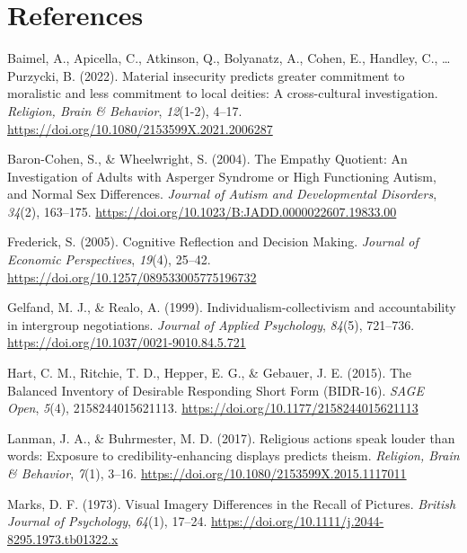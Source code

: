 \documentclass[
  letterpaper,
]{scrbook}
\newlength{\cslhangindent}
\newenvironment{CSLReferences}[2] %
 {\begin{list}{}{%
  \setlength{\itemindent}{0pt}
  \setlength{\leftmargin}{0pt}
  \setlength{\parsep}{0pt}
  \ifodd #1
   \setlength{\leftmargin}{\cslhangindent}
   \setlength{\itemindent}{-1\cslhangindent}
  \fi
  \setlength{\itemsep}{#2\baselineskip}}}
 {\end{list}}
\begin{document}
\chapter*{References}\label{references-1}


\label{refs}
\begin{CSLReferences}{1}{0}
Baimel, A., Apicella, C., Atkinson, Q., Bolyanatz, A., Cohen, E.,
Handley, C., \ldots{} Purzycki, B. (2022). Material insecurity predicts
greater commitment to moralistic and less commitment to local deities: A
cross-cultural investigation. \emph{Religion, Brain \& Behavior},
\emph{12}(1-2), 4--17.
\url{https://doi.org/10.1080/2153599X.2021.2006287}

Baron-Cohen, S., \& Wheelwright, S. (2004). The {Empathy Quotient}: {An
Investigation} of {Adults} with {Asperger Syndrome} or {High Functioning
Autism}, and {Normal Sex Differences}. \emph{Journal of Autism and
Developmental Disorders}, \emph{34}(2), 163--175.
\url{https://doi.org/10.1023/B:JADD.0000022607.19833.00}

Frederick, S. (2005). Cognitive {Reflection} and {Decision Making}.
\emph{Journal of Economic Perspectives}, \emph{19}(4), 25--42.
\url{https://doi.org/10.1257/089533005775196732}

Gelfand, M. J., \& Realo, A. (1999). Individualism-collectivism and
accountability in intergroup negotiations. \emph{Journal of Applied
Psychology}, \emph{84}(5), 721--736.
\url{https://doi.org/10.1037/0021-9010.84.5.721}

Hart, C. M., Ritchie, T. D., Hepper, E. G., \& Gebauer, J. E. (2015).
The {Balanced Inventory} of {Desirable Responding Short Form}
({BIDR-16}). \emph{SAGE Open}, \emph{5}(4), 2158244015621113.
\url{https://doi.org/10.1177/2158244015621113}

Lanman, J. A., \& Buhrmester, M. D. (2017). Religious actions speak
louder than words: Exposure to credibility-enhancing displays predicts
theism. \emph{Religion, Brain \& Behavior}, \emph{7}(1), 3--16.
\url{https://doi.org/10.1080/2153599X.2015.1117011}

Marks, D. F. (1973). Visual {Imagery Differences} in the {Recall} of
{Pictures}. \emph{British Journal of Psychology}, \emph{64}(1), 17--24.
\url{https://doi.org/10.1111/j.2044-8295.1973.tb01322.x}


\end{CSLReferences}
\end{document}
